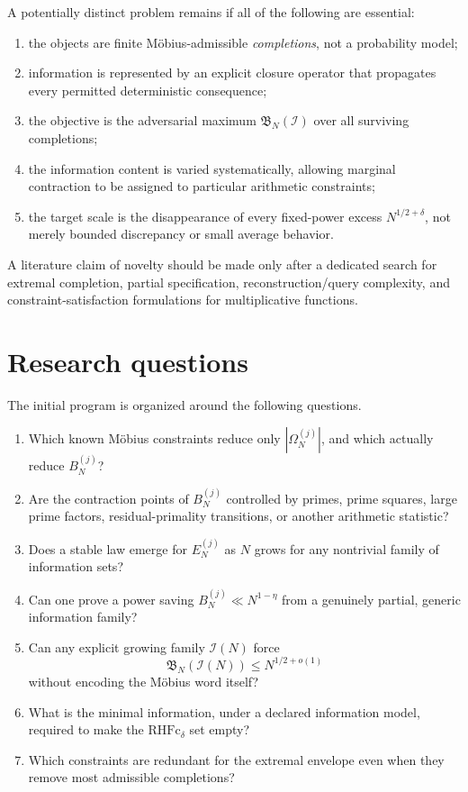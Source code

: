 \documentclass[11pt]{article}
\newcommand{\Om}{\Omega}
\newcommand{\RHFc}{\mathrm{RHFc}}
\begin{document}
A potentially distinct problem remains if all of the following are essential:
\begin{enumerate}
\item the objects are finite Möbius-admissible \emph{completions}, not a probability model;
\item information is represented by an explicit closure operator that propagates every permitted deterministic consequence;
\item the objective is the adversarial maximum $\mathfrak B_N(\mathcal I)$ over all surviving completions;
\item the information content is varied systematically, allowing marginal contraction to be assigned to particular arithmetic constraints;
\item the target scale is the disappearance of every fixed-power excess $N^{1/2+\delta}$, not merely bounded discrepancy or small average behavior.
\end{enumerate}
A literature claim of novelty should be made only after a dedicated search for extremal completion, partial specification, reconstruction/query complexity, and constraint-satisfaction formulations for multiplicative functions.

\section{Research questions}
The initial program is organized around the following questions.
\begin{enumerate}
\item Which known Möbius constraints reduce only $|\Om_N^{(j)}|$, and which actually reduce $B_N^{(j)}$?
\item Are the contraction points of $B_N^{(j)}$ controlled by primes, prime squares, large prime factors, residual-primality transitions, or another arithmetic statistic?
\item Does a stable law emerge for $E_N^{(j)}$ as $N$ grows for any nontrivial family of information sets?
\item Can one prove a power saving $B_N^{(j)}\ll N^{1-\eta}$ from a genuinely partial, generic information family?
\item Can any explicit growing family $\mathcal I(N)$ force
\[
 \mathfrak B_N(\mathcal I(N))\le N^{1/2+o(1)}
\]
without encoding the Möbius word itself?
\item What is the minimal information, under a declared information model, required to make the $\RHFc_\delta$ set empty?
\item Which constraints are redundant for the extremal envelope even when they remove most admissible completions?
\end{enumerate}
\end{document}
